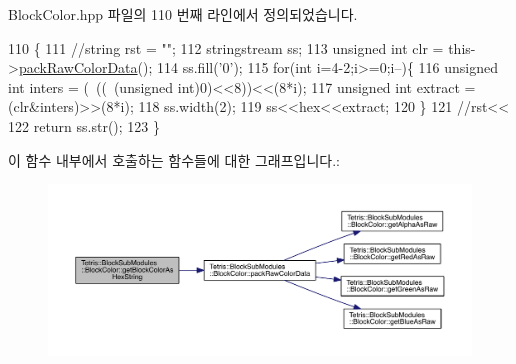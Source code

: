 Block\+Color.\+hpp 파일의 110 번째 라인에서 정의되었습니다.


\begin{DoxyCode}
110                                              \{
111                 \textcolor{comment}{//string rst = "";}
112                 stringstream ss;
113                 \textcolor{keywordtype}{unsigned} \textcolor{keywordtype}{int} clr = this->\hyperlink{class_tetris_1_1_block_sub_modules_1_1_block_color_a849ebbb0e900c5efdcb99784767e7a7a}{packRawColorData}();
114                 ss.fill(\textcolor{charliteral}{'0'});
115                 \textcolor{keywordflow}{for}(\textcolor{keywordtype}{int} i=4-2;i>=0;i--)\{
116                     \textcolor{keywordtype}{unsigned} \textcolor{keywordtype}{int} inters = (~((~(\textcolor{keywordtype}{unsigned} int)0)<<8))<<(8*i);
117                     \textcolor{keywordtype}{unsigned} \textcolor{keywordtype}{int} extract = (clr&inters)>>(8*i);
118                     ss.width(2);
119                     ss<<hex<<extract;
120                 \}
121                 \textcolor{comment}{//rst<<}
122                 \textcolor{keywordflow}{return} ss.str();
123             \}
\end{DoxyCode}
이 함수 내부에서 호출하는 함수들에 대한 그래프입니다.\+:
\nopagebreak
\begin{figure}[H]
\begin{center}
\leavevmode
\includegraphics[width=350pt]{de/d44/class_tetris_1_1_block_sub_modules_1_1_block_color_a79cc837f207645628542876997c9e919_cgraph}
\end{center}
\end{figure}
\mbox{\label{class_tetris_1_1_block_sub_modules_1_1_block_color_ac0ad44a8b001f3824447d137357f5145}} 
